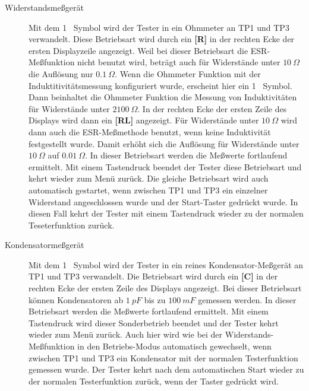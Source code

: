 \begin{description}
 \item[Widerstandsmeßgerät]
Mit dem \mbox{1 } Symbol wird der Tester in ein Ohmmeter an TP1 und TP3 verwandelt. Diese Betriebsart wird durch
ein {\bf[R]} in der rechten Ecke der ersten Displayzeile angezeigt. Weil bei dieser Betriebsart die
ESR-Meßfunktion nicht benutzt wird, beträgt auch für Widerstände unter \(10~\Omega\) die Auflösung
nur \(0.1~\Omega\). Wenn die Ohmmeter Funktion mit der Induktitivitätsmessung konfiguriert wurde,
erscheint hier ein \mbox{1 \electricR {}} Symbol.
Dann beinhaltet die Ohmmeter Funktion die Messung von Induktivitäten für Widerstände unter \(2100~\Omega\). 
In der rechten Ecke der ersten Zeile des Displays wird dann ein {\bf[RL]} angezeigt.
Für Widerstände unter \(10~\Omega\) wird dann auch die ESR-Meßmethode benutzt,
wenn keine Induktivität festgestellt wurde. Damit erhöht sich die Auflösung für Widerstände
unter \(10~\Omega\) auf \(0.01~\Omega\).
In dieser Betriebsart werden die Meßwerte fortlaufend ermittelt.
Mit einem Tastendruck beendet der Tester diese Betriebsart und kehrt wieder zum Menü zurück.
Die gleiche Betriebsart wird auch automatisch gestartet, wenn zwischen TP1 und TP3 ein einzelner Widerstand
angeschlossen wurde und der Start-Taster gedrückt wurde. In diesen Fall kehrt der Tester mit einem Tastendruck 
wieder zu der normalen Teseterfunktion zurück.

 \item[Kondensatormeßgerät]
Mit dem \mbox{1 } Symbol wird der Tester
in ein reines Kondensator-Meßgerät an TP1 und TP3 verwandelt.
Die Betriebsart wird durch ein {\bf[C]} in der rechten Ecke der ersten Zeile des Displays angezeigt.
Bei dieser Betriebsart können Kondensatoren ab \(1~pF\) bis zu \(100~mF\) gemessen werden.
In dieser Betriebsart werden die Meßwerte fortlaufend ermittelt.
Mit einem Tastendruck wird dieser Sonderbetrieb beendet und der Tester kehrt wieder zum Menü zurück.
Auch hier wird wie bei der Widerstands-Meßfunktion in den  Betriebs-Modus automatisch gewechselt,
 wenn zwischen TP1 und TP3 ein Kondensator mit der normalen Testerfunktion gemessen wurde.
Der Tester kehrt nach dem automatischen Start wieder zu der normalen Testerfunktion zurück, wenn der Taster gedrückt wird.


\end{description}
